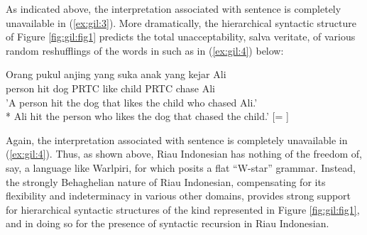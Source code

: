 \documentclass[output=paper,colorlinks,citecolor=brown
]{langscibook}
\begin{document}
As indicated above, the interpretation associated with sentence  is completely unavailable in (\ref{ex:gil:3}).  More dramatically, the hierarchical syntactic structure of Figure \ref{fig:gil:fig1} predicts the total unacceptability, salva veritate, of various random reshufflings of the words in  such as in (\ref{ex:gil:4}) below:

\ea \label{ex:gil:4}
\gll Orang	pukul	anjing	yang	suka	anak	yang	kejar	Ali \\
    person	hit	dog	PRTC	like	child	PRTC	chase	Ali\\
\glt 		'A person hit the dog that likes the child who chased Ali.' \\
*	Ali hit the person who likes the dog that chased the child.' [= ]
\z

Again, the interpretation associated with sentence  is completely unavailable in (\ref{ex:gil:4}).  Thus, as shown above, Riau Indonesian has nothing of the freedom of, say, a language like Warlpiri, for which \citet{hale1979position, hale1983warlpiri} posits a flat ``W-star'' grammar. Instead, the strongly Behaghelian nature of Riau Indonesian, compensating for its flexibility and indeterminacy in various other domains, provides strong support for hierarchical syntactic structures of the kind represented in Figure \ref{fig:gil:fig1}, and in doing so for the presence of syntactic recursion in Riau Indonesian.
\end{document}
